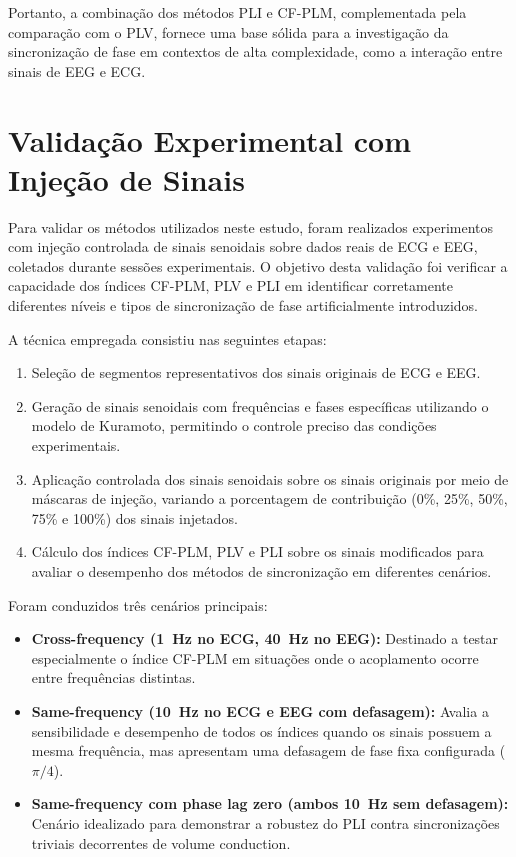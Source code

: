 Portanto, a combinação dos métodos PLI e CF-PLM, complementada pela comparação com o PLV, fornece uma base sólida para a investigação da sincronização de fase em contextos de alta complexidade, como a interação entre sinais de EEG e ECG.

\section{Validação Experimental com Injeção de Sinais}

Para validar os métodos utilizados neste estudo, foram realizados experimentos com injeção controlada de sinais senoidais sobre dados reais de ECG e EEG, coletados durante sessões experimentais. O objetivo desta validação foi verificar a capacidade dos índices CF-PLM, PLV e PLI em identificar corretamente diferentes níveis e tipos de sincronização de fase artificialmente introduzidos.

A técnica empregada consistiu nas seguintes etapas:
\begin{enumerate}
    \item Seleção de segmentos representativos dos sinais originais de ECG e EEG.
    \item Geração de sinais senoidais com frequências e fases específicas utilizando o modelo de Kuramoto, permitindo o controle preciso das condições experimentais.
    \item Aplicação controlada dos sinais senoidais sobre os sinais originais por meio de máscaras de injeção, variando a porcentagem de contribuição (0\%, 25\%, 50\%, 75\% e 100\%) dos sinais injetados.
    \item Cálculo dos índices CF-PLM, PLV e PLI sobre os sinais modificados para avaliar o desempenho dos métodos de sincronização em diferentes cenários.
\end{enumerate}

Foram conduzidos três cenários principais:

\begin{itemize}
    \item \textbf{Cross-frequency (1~Hz no ECG, 40~Hz no EEG):} Destinado a testar especialmente o índice CF-PLM em situações onde o acoplamento ocorre entre frequências distintas.
    \item \textbf{Same-frequency (10~Hz no ECG e EEG com defasagem):} Avalia a sensibilidade e desempenho de todos os índices quando os sinais possuem a mesma frequência, mas apresentam uma defasagem de fase fixa configurada (\(\pi/4\)).
    \item \textbf{Same-frequency com phase lag zero (ambos 10~Hz sem defasagem):} Cenário idealizado para demonstrar a robustez do PLI contra sincronizações triviais decorrentes de volume conduction.
\end{itemize}


